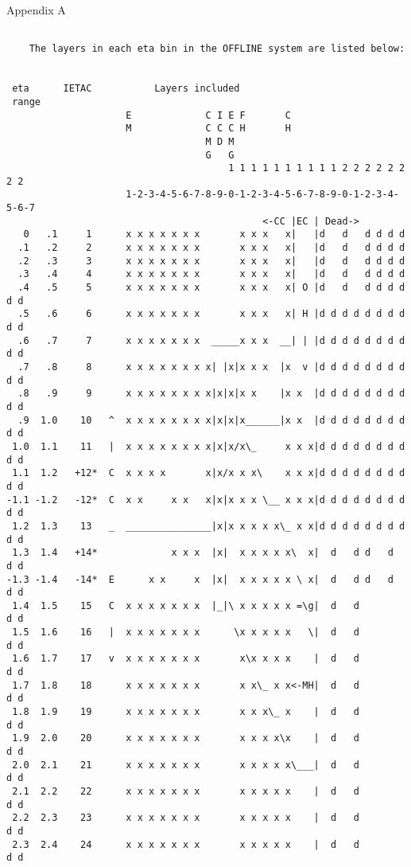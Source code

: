 \centerline{Appendix A}

\begin{verbatim}

    The layers in each eta bin in the OFFLINE system are listed below:


 eta      IETAC           Layers included
 range
                     E             C I E F       C
                     M             C C C H       H
                                   M D M
                                   G   G
                                       1 1 1 1 1 1 1 1 1 1 2 2 2 2 2 2 2 2
                     1-2-3-4-5-6-7-8-9-0-1-2-3-4-5-6-7-8-9-0-1-2-3-4-5-6-7
                                             <-CC |EC | Dead->
   0   .1     1      x x x x x x x       x x x   x|   |d   d   d d d d
  .1   .2     2      x x x x x x x       x x x   x|   |d   d   d d d d
  .2   .3     3      x x x x x x x       x x x   x|   |d   d   d d d d
  .3   .4     4      x x x x x x x       x x x   x|   |d   d   d d d d
  .4   .5     5      x x x x x x x       x x x   x| O |d   d   d d d d d d
  .5   .6     6      x x x x x x x       x x x   x| H |d d d d d d d d d d
  .6   .7     7      x x x x x x x  _____x x x  __| | |d d d d d d d d d d
  .7   .8     8      x x x x x x x x| |x|x x x  |x  v |d d d d d d d d d d
  .8   .9     9      x x x x x x x x|x|x|x x    |x x  |d d d d d d d d d d
  .9  1.0    10   ^  x x x x x x x x|x|x|x______|x x  |d d d d d d d d d d
 1.0  1.1    11   |  x x x x x x x x|x|x/x\_     x x x|d d d d d d d d d d
 1.1  1.2   +12*  C  x x x x       x|x/x x x\    x x x|d d d d d d d d d d
-1.1 -1.2   -12*  C  x x     x x   x|x|x x x \__ x x x|d d d d d d d d d d
 1.2  1.3    13   _  _______________|x|x x x x x\_ x x|d d d d d d d d d d
 1.3  1.4   +14*             x x x  |x|  x x x x x\  x|  d   d d   d   d d
-1.3 -1.4   -14*  E      x x     x  |x|  x x x x x \ x|  d   d d   d   d d
 1.4  1.5    15   C  x x x x x x x  |_|\ x x x x x =\g|  d   d         d d
 1.5  1.6    16   |  x x x x x x x      \x x x x x   \|  d   d         d d
 1.6  1.7    17   v  x x x x x x x       x\x x x x    |  d   d         d d
 1.7  1.8    18      x x x x x x x       x x\_ x x<-MH|  d   d         d d
 1.8  1.9    19      x x x x x x x       x x x\_ x    |  d   d         d d
 1.9  2.0    20      x x x x x x x       x x x x\x    |  d   d         d d
 2.0  2.1    21      x x x x x x x       x x x x x\___|  d   d         d d
 2.1  2.2    22      x x x x x x x       x x x x x    |  d   d         d d
 2.2  2.3    23      x x x x x x x       x x x x x    |  d   d         d d
 2.3  2.4    24      x x x x x x x       x x x x x    |  d   d         d d

\end{verbatim}
